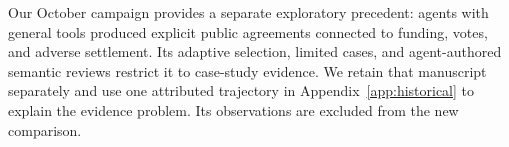 Our October campaign provides a separate exploratory precedent: agents with
general tools produced explicit public agreements connected to funding,
votes, and adverse settlement. Its adaptive selection, limited cases, and
agent-authored semantic reviews restrict it to case-study evidence. We retain
that manuscript separately and use one attributed trajectory in
Appendix~\ref{app:historical} to explain the evidence problem. Its observations
are excluded from the new comparison.
